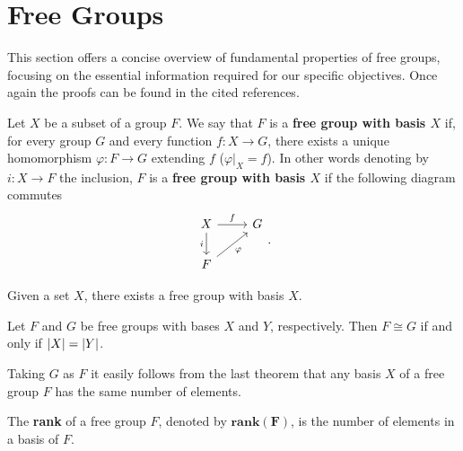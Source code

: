 \section{Free Groups}

This section offers a concise overview of fundamental properties of free groups, focusing on the essential information required for our specific objectives. 
Once again the proofs can be found in the cited references.

\begin{definition}
    Let $X$ be a subset of a group $F$. We say that $F$ is a \textbf{free group with basis $X$} if, for every group $G$ and every function $f \colon X \rightarrow G$, there exists a unique homomorphism $\varphi \colon F \rightarrow G$ extending $f$ ($\varphi |_X = f$). In other words denoting by $i \colon X \rightarrow F$ the inclusion, $F$ is a \textbf{free group with basis $X$} if the following diagram commutes 
    \[\begin{tikzcd}
        X & G \\
        F
        \arrow["f", from=1-1, to=1-2]
        \arrow["i"', from=1-1, to=2-1]
        \arrow["\varphi"', from=2-1, to=1-2]
    \end{tikzcd}.\]
\end{definition}

\begin{theorem}
    \cite[p.~344]{RotmanITG}
    Given a set $X$, there exists a free group with basis $X$.
\end{theorem}

\begin{theorem}
    \cite[p.~348]{RotmanITG}
    Let $F$ and $G$ be free groups with bases $X$ and $Y$, respectively. 
    Then $F \cong G$ if and only if $| X | = | Y |$. 
\end{theorem}

Taking $G$ as $F$ it easily follows from the last theorem that any basis $X$ of a free group $F$ has the same number of elements.

\begin{definition}
    The \textbf{rank} of a free group $F$, denoted by $\mathbf{rank(F)}$, is the number of elements in a basis of $F$. 
\end{definition}